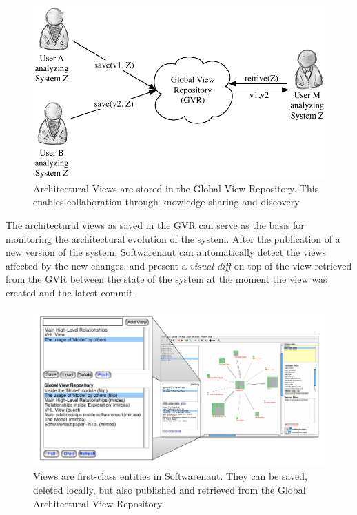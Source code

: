 \documentclass[preprint,12pt]{elsarticle}
\begin{document}
\begin{figure}[ht]
\begin{center}
\includegraphics[width=0.7\linewidth]{images/CollaborationConcept}
\caption{Architectural Views are stored in the Global View Repository. This enables collaboration through knowledge sharing and discovery}
\end{center}
\end{figure}

The architectural views as saved in the GVR can serve as the basis for monitoring the architectural evolution of the system. After the publication of a new version of the system, Softwarenaut can automatically detect the views affected by the new changes, and present a {\em visual diff} on top of the view retrieved from the GVR between the state of the system at the moment the view was created and the latest commit.

\begin{figure}[ht]
\begin{center}
\includegraphics[width=1.05\linewidth]{ViewOperations}
\caption{Views are first-class entities in Softwarenaut. They can be saved, deleted locally, but also published and retrieved from the Global Architectural View Repository.}
\end{center}
\end{figure}
\end{document}
